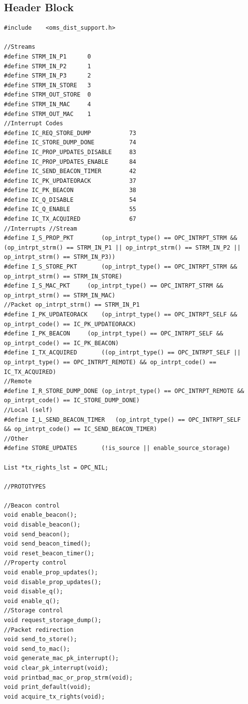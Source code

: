 \subsection{Header Block}
{\tiny
\begin{verbatim}
#include	<oms_dist_support.h>

//Streams
#define STRM_IN_P1		0
#define STRM_IN_P2		1
#define STRM_IN_P3		2
#define STRM_IN_STORE	3
#define STRM_OUT_STORE	0
#define STRM_IN_MAC		4
#define STRM_OUT_MAC 	1
//Interrupt Codes
#define IC_REQ_STORE_DUMP			73
#define IC_STORE_DUMP_DONE			74
#define IC_PROP_UPDATES_DISABLE		83
#define IC_PROP_UPDATES_ENABLE		84
#define IC_SEND_BEACON_TIMER		42
#define IC_PK_UPDATEORACK			37
#define IC_PK_BEACON				38
#define IC_Q_DISABLE				54
#define IC_Q_ENABLE					55
#define IC_TX_ACQUIRED				67
//Interrupts //Stream
#define I_S_PROP_PKT		(op_intrpt_type() == OPC_INTRPT_STRM && (op_intrpt_strm() == STRM_IN_P1 || op_intrpt_strm() == STRM_IN_P2 || op_intrpt_strm() == STRM_IN_P3))
#define I_S_STORE_PKT		(op_intrpt_type() == OPC_INTRPT_STRM && op_intrpt_strm() == STRM_IN_STORE)
#define I_S_MAC_PKT		(op_intrpt_type() == OPC_INTRPT_STRM && op_intrpt_strm() == STRM_IN_MAC)
//Packet op_intrpt_strm() == STRM_IN_P1
#define I_PK_UPDATEORACK	(op_intrpt_type() == OPC_INTRPT_SELF && op_intrpt_code() == IC_PK_UPDATEORACK)
#define I_PK_BEACON		(op_intrpt_type() == OPC_INTRPT_SELF && op_intrpt_code() == IC_PK_BEACON)
#define I_TX_ACQUIRED		((op_intrpt_type() == OPC_INTRPT_SELF || op_intrpt_type() == OPC_INTRPT_REMOTE) && op_intrpt_code() == IC_TX_ACQUIRED)
//Remote
#define I_R_STORE_DUMP_DONE	(op_intrpt_type() == OPC_INTRPT_REMOTE && op_intrpt_code() == IC_STORE_DUMP_DONE)
//Local (self)
#define I_L_SEND_BEACON_TIMER 	(op_intrpt_type() == OPC_INTRPT_SELF && op_intrpt_code() == IC_SEND_BEACON_TIMER)
//Other
#define STORE_UPDATES		(!is_source || enable_source_storage)

List *tx_rights_lst = OPC_NIL;
 
//PROTOTYPES
 
//Beacon control
void enable_beacon();
void disable_beacon();
void send_beacon();
void send_beacon_timed();
void reset_beacon_timer();
//Property control
void enable_prop_updates();
void disable_prop_updates();
void disable_q();
void enable_q();
//Storage control
void request_storage_dump();
//Packet redirection 
void send_to_store();
void send_to_mac();
void generate_mac_pk_interrupt();
void clear_pk_interrupt(void);
void printbad_mac_or_prop_strm(void);
void print_default(void);
void acquire_tx_rights(void);
\end{verbatim}
}

